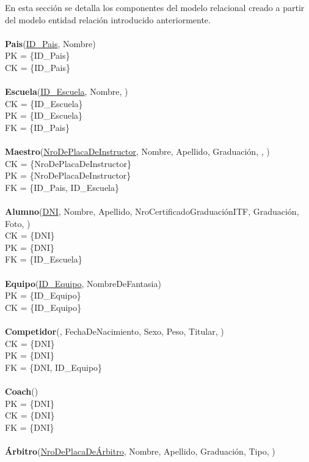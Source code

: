 En esta sección se detalla los componentes del modelo relacional creado a partir del modelo entidad relación introducido anteriormente.\\
\\
\textbf{Pais}(\uline{ID\_Pais}, Nombre)\\
PK = \{ID\_Pais\}\\
CK = \{ID\_Pais\}\\
\\
\textbf{Escuela}(\uline{ID\_Escuela}, Nombre, )\\
CK = \{ID\_Escuela\}\\
PK = \{ID\_Escuela\}\\
FK = \{ID\_Pais\}\\
\\
\textbf{Maestro}(\uline{NroDePlacaDeInstructor}, Nombre, Apellido, Graduación, , )\\
CK = \{NroDePlacaDeInstructor\}\\
PK = \{NroDePlacaDeInstructor\}\\
FK = \{ID\_Pais, ID\_Escuela\}\\
\\
\textbf{Alumno}(\uline{DNI}, Nombre, Apellido, NroCertificadoGraduaciónITF, Graduación, Foto, )\\
CK = \{DNI\}\\
PK = \{DNI\}\\
FK = \{ID\_Escuela\}\\
\\
\textbf{Equipo}(\uline{ID\_Equipo}, NombreDeFantasia)\\
PK = \{ID\_Equipo\}\\
CK = \{ID\_Equipo\}\\
\\
\textbf{Competidor}(\uline{}, FechaDeNacimiento, Sexo, Peso, Titular, )\\
CK = \{DNI\}\\
PK = \{DNI\}\\
FK = \{DNI, ID\_Equipo\}\\
\\
\textbf{Coach}(\uline{})\\
PK = \{DNI\}\\
CK = \{DNI\}\\
FK = \{DNI\}\\
\\
\textbf{Árbitro}(\uline{NroDePlacaDeÁrbitro}, Nombre, Apellido, Graduación, Tipo, )\\
